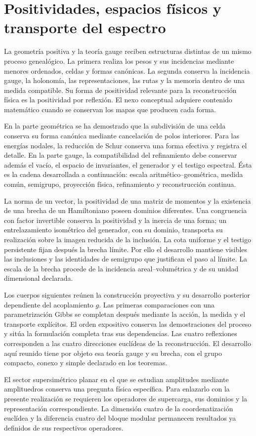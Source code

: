 \section{Positividades, espacios físicos y transporte del espectro}
La geometría positiva y la teoría gauge reciben estructuras distintas de
un mismo proceso genealógico. La primera realiza los pesos y sus
incidencias mediante menores ordenados, celdas y formas canónicas.
La segunda conserva la incidencia gauge, la holonomía, las
representaciones, las rutas y la memoria dentro de una medida compatible.
Su forma de positividad relevante para la reconstrucción física es la
positividad por reflexión. El nexo conceptual adquiere contenido
matemático cuando se conservan los mapas que producen cada forma.

En la parte geométrica se ha demostrado que la subdivisión de una celda
conserva su forma canónica mediante cancelación de polos interiores.
Para las energías nodales, la reducción de Schur conserva una forma
efectiva y registra el detalle. En la parte gauge, la compatibilidad del
refinamiento debe conservar además el vacío, el espacio de invariantes,
el generador y el testigo espectral. Ésta es la cadena desarrollada a
continuación: escala aritmético--geométrica, medida común, semigrupo,
proyección física, refinamiento y reconstrucción continua.

La norma de un vector, la positividad de una matriz de momentos y la
existencia de una brecha de un Hamiltoniano poseen dominios diferentes.
Una congruencia con factor invertible conserva la positividad y la
inercia de una forma; un entrelazamiento isométrico del generador, con su
dominio, transporta su realización sobre la imagen reducida de la
inclusión. La cota uniforme y el testigo persistente fijan después la
brecha límite. Por ello el desarrollo mantiene visibles las
inclusiones y las identidades de semigrupo que justifican el paso al
límite. La escala de la brecha procede de la incidencia areal--volumétrica
y de su unidad dimensional declarada.

Los cuerpos siguientes reúnen la construcción proyectiva y su
desarrollo posterior dependiente del acoplamiento \(g\). Las primeras
comparaciones con una parametrización Gibbs se completan después mediante
la acción, la medida y el transporte explícitos. El orden expositivo
conserva las demostraciones del proceso y sitúa la formulación completa
tras sus dependencias. Las cuatro reflexiones corresponden a las cuatro
direcciones euclídeas de la reconstrucción. El desarrollo aquí reunido
tiene por objeto esa teoría gauge y su brecha, con el grupo compacto,
conexo y simple declarado en los teoremas.

El sector supersimétrico planar en el que se estudian amplitudes mediante
amplituedros conserva una pregunta física específica. Para enlazarlo con
la presente realización se requieren los operadores de supercarga, sus
dominios y la representación correspondiente. La dimensión cuatro de la
coordenatización euclídea y la diferencia cuatro del bloque modular permanecen
resultados ya definidos de sus respectivos operadores.
